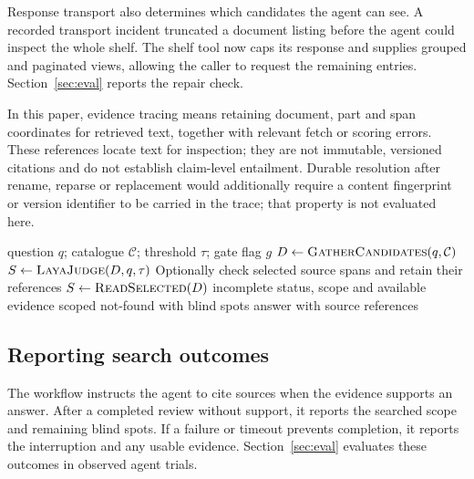 Response transport also determines which candidates the agent can see.
A recorded transport incident truncated a document listing before the
agent could inspect the whole shelf. The shelf tool now caps its response and
supplies grouped and paginated views, allowing the caller to request the
remaining entries. Section~\ref{sec:eval} reports the repair check.

In this paper, evidence tracing means retaining document, part and span
coordinates for retrieved text, together with relevant fetch or scoring
errors. These references locate text for inspection; they are not immutable,
versioned citations and do not establish claim-level entailment. Durable
resolution after rename, reparse or replacement would additionally require a
content fingerprint or version identifier to be carried in the trace; that
property is not evaluated here.

\begin{algorithm}[tbp]
\caption{Tiered access with optional evidence gate}
\label{alg:tiered}
\begin{algorithmic}[1]
\Require question $q$; catalogue $\mathcal{C}$; threshold $\tau$; gate flag $g$
\State $D \gets \textsc{GatherCandidates}(q,\mathcal{C})$ 
  \State $S \gets \textsc{LayaJudge}(D,q,\tau)$ 
  \State Optionally check selected source spans and retain their references
\Else
  \State $S \gets \textsc{ReadSelected}(D)$
\EndIf
{}
  \State \Return incomplete status, scope and available evidence
  \State \Return scoped not-found with blind spots
\Else
  \State \Return answer with source references
\EndIf
\end{algorithmic}
\end{algorithm}

\subsection{Reporting search outcomes}
The workflow instructs the agent to cite sources when the evidence
supports an answer. After a completed review without support, it reports
the searched scope and remaining blind spots. If a failure or timeout
prevents completion, it reports the interruption and any usable evidence.
Section~\ref{sec:eval} evaluates these outcomes in observed agent trials.
